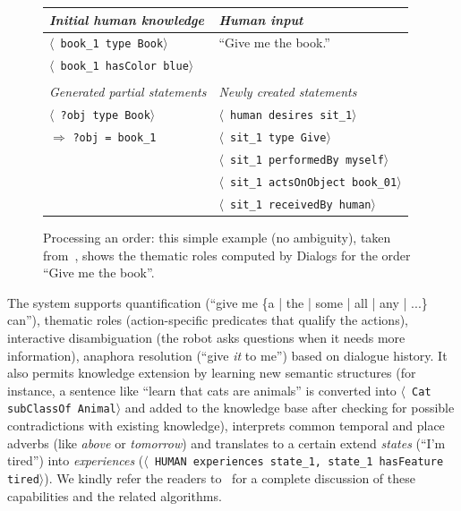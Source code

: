 \documentclass[preprint,3p,times]{elsarticle}
\newcommand{\concept}[1]{{\small \texttt{#1}}}
\newcommand{\stmt}[1]{{\footnotesize \tt $\langle$ #1\relax$\rangle$}}
\begin{document}
\begin{figure}
    \centering
	\begin{tabular}{l|l}
	\emph{Initial human knowledge} &
	\emph{Human input}\\
	
	\hline
	
    	\stmt{book\_1 type Book} &
	``Give me the book.'' \\
	
    	\stmt{book\_1 hasColor blue} & \\
	\vspace{0.5em}\\
	\hline
    	
	\emph{Generated partial statements} &
	\emph{Newly created statements}\\
	\hline
    	\stmt{?obj type Book} & 
	\stmt{human desires sit\_1} \\
	
	\hspace{0.2cm}$\Rightarrow$ \concept{?obj = book\_1}
    	& \stmt{sit\_1 type Give} \\
    	& \stmt{sit\_1 performedBy myself} \\
    	& \stmt{sit\_1 actsOnObject book\_01} \\
    	& \stmt{sit\_1 receivedBy human} \\
	\end{tabular}

    \caption{Processing an order: this simple example (no ambiguity), taken
    from~\cite{Lemaignan2011a}, shows the thematic roles computed by 
    {\sc Dialogs} for the order ``Give me the book''.}

    \label{dialogs|ex}
\end{figure}


The system supports quantification (``give me \{a | the | some | all | any |
...\} can''), thematic roles (action-specific predicates that qualify the
actions), interactive disambiguation (the robot asks questions when it needs
more information), anaphora resolution (``give \emph{it} to me'') based on
dialogue history. It also permits knowledge extension by learning new semantic
structures (for instance, a sentence like ``learn that cats are animals'' is
converted into \stmt{Cat subClassOf Animal} and added to the knowledge base
after checking for possible contradictions with existing knowledge),
interprets common temporal and place adverbs (like \emph{above} or
\emph{tomorrow}) and translates to a certain extend \emph{states} (``I'm
tired'') into \emph{experiences} (\stmt{HUMAN experiences state\_1, state\_1
hasFeature tired}). We kindly refer the readers to~\cite{Lemaignan2011a} for a
complete discussion of these capabilities and the related algorithms.
\end{document}
